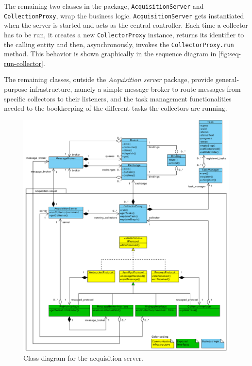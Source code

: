 The remaining two classes in the package, \texttt{AcquisitionServer} and \texttt{CollectionProxy}, wrap the business logic. \texttt{AcquisitionServer} gets instantiated when the server is started and acts as the central controller. Each time a collector has to be run, it creates a new \texttt{CollectorProxy} instance, returns its identifier to the calling entity and then, asynchronously, invokes the \texttt{CollectorProxy.run} method. This behavior is shown graphically in the sequence diagram in \vref{fig:seq-run-collector}.

The remaining classes, outside the \emph{Acquisition server} package, provide general-purpose infrastructure, namely a simple message broker to route messages from specific collectors to their listeners, and the task management functionalities needed to the bookkeeping of the different tasks the collectors are running.

\begin{figure}
  \centering
  \includegraphics[width=0.98\linewidth]{images/diagrams/class-collector-server}
  \caption[Class diagram for the acquisition server.]{Class diagram for the acquisition server.}
  \label{fig:class-collector-server}
  \vspace{1cm}
\end{figure}

